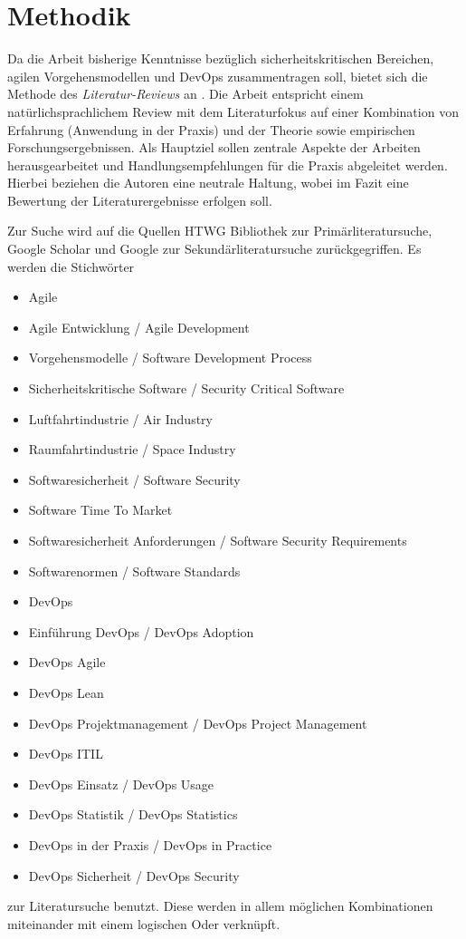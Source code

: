 \section{Methodik}

Da die Arbeit bisherige Kenntnisse bezüglich sicherheitskritischen Bereichen, agilen Vorgehensmodellen und DevOps zusammentragen soll, bietet sich die Methode des \emph{Literatur-Reviews} an \parencite[vgl.][]{Fettke:2006aa}.
Die Arbeit entspricht einem natürlichsprachlichem Review mit dem Literaturfokus auf einer Kombination von Erfahrung (Anwendung in der Praxis) und der Theorie sowie empirischen Forschungsergebnissen.
Als Hauptziel sollen zentrale Aspekte der Arbeiten herausgearbeitet und Handlungsempfehlungen für die Praxis abgeleitet werden.
Hierbei beziehen die Autoren eine neutrale Haltung, wobei im Fazit eine Bewertung der Literaturergebnisse erfolgen soll.

Zur Suche wird auf die Quellen HTWG Bibliothek \parencite[][]{HTWGaa} zur Primärliteratursuche, Google Scholar und Google zur Sekundärliteratursuche zurückgegriffen.
Es werden die Stichwörter
\begin{itemize}
\item Agile
\item Agile Entwicklung / Agile Development
\item Vorgehensmodelle / Software Development Process
\item Sicherheitskritische Software / Security Critical Software
\item Luftfahrtindustrie / Air Industry
\item Raumfahrtindustrie / Space Industry
\item Softwaresicherheit / Software Security
\item Software Time To Market
\item Softwaresicherheit Anforderungen / Software Security Requirements
\item Softwarenormen / Software Standards
\item DevOps
\item Einführung DevOps / DevOps Adoption
\item DevOps Agile
\item DevOps Lean
\item DevOps Projektmanagement / DevOps Project Management
\item DevOps ITIL
\item DevOps Einsatz / DevOps Usage
\item DevOps Statistik / DevOps Statistics
\item DevOps in der Praxis / DevOps in Practice
\item DevOps Sicherheit / DevOps Security
\end{itemize}
zur Literatursuche benutzt.
Diese werden in allem möglichen Kombinationen miteinander mit einem logischen Oder verknüpft.

